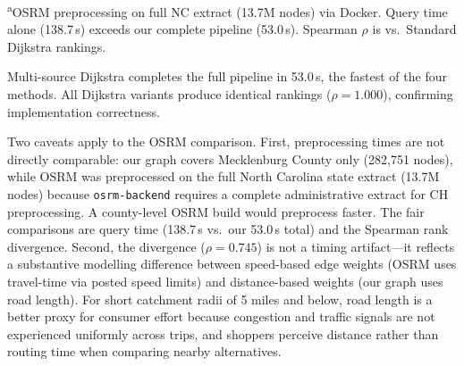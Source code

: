 \documentclass[conference]{IEEEtran}
\begin{document}
\begin{table}[!t]
\centering
\caption{V3: Routing Method Comparison
(Charlotte, 559 BGs, 2,450 cands, 282,751 nodes)}
\label{tab:v3_comparison}
\vspace{2pt}
\footnotesize\textsuperscript{a}OSRM preprocessing on full NC extract (13.7M nodes) via
Docker. Query time alone (138.7\,s) exceeds our complete pipeline (53.0\,s).
Spearman $\rho$ is vs.\ Standard Dijkstra rankings.
\end{table}

Multi-source Dijkstra completes the full pipeline in 53.0\,s, the
fastest of the four methods. All Dijkstra variants produce identical
rankings ($\rho = 1.000$), confirming implementation correctness.

Two caveats apply to the OSRM comparison. First, preprocessing times
are not directly comparable: our graph covers Mecklenburg County only
(282{,}751 nodes), while OSRM was preprocessed on the full North
Carolina state extract (13.7M nodes) because \texttt{osrm-backend}
requires a complete administrative extract for CH preprocessing. A
county-level OSRM build would preprocess faster. The fair comparisons
are query time (138.7\,s vs.\ our 53.0\,s total) and the Spearman
rank divergence. Second, the divergence ($\rho = 0.745$) is not a
timing artifact---it reflects a substantive modelling difference
between speed-based edge weights (OSRM uses travel-time via posted
speed limits) and distance-based weights (our graph uses road length).
For short catchment radii of 5 miles and below, road length is a
better proxy for consumer effort because congestion and traffic
signals are not experienced uniformly across trips, and shoppers
perceive distance rather than routing time when comparing nearby
alternatives.
\end{document}
